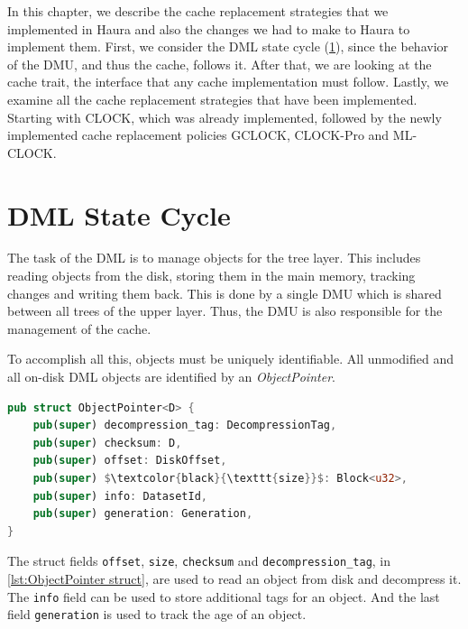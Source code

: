 \documentclass[
	12pt,
	a4paper,
	abstract,
	bibliography=totoc,
	chapterprefix,
	headings=openright,
	numbers=endperiod,
	parskip=half,
	twoside,
]{scrreprt}
\begin{document}

In this chapter, we describe the cache replacement strategies that we implemented in Haura 
and also the changes we had to make to Haura to implement them.
First, we consider the DML state cycle (\cref{sec:dml state cycle}), 
since the behavior of the DMU, and thus the cache, follows it.
After that, we are looking at the cache trait, the interface that any cache implementation must follow.
Lastly, we examine all the cache replacement strategies that have been implemented.
Starting with CLOCK, which was already implemented,
followed by the newly implemented cache replacement policies GCLOCK, CLOCK-Pro and ML-CLOCK.


\section{DML State Cycle}
\label{sec:dml state cycle}

The task of the DML is to manage objects for the tree layer. This includes reading objects from the disk, storing them in the main memory, tracking changes and writing them back.
This is done by a single DMU which is shared between all trees of the upper layer.
Thus, the DMU is also responsible for the management of the cache.

To accomplish all this, objects must be uniquely identifiable.
All unmodified and all on-disk DML objects are identified by an \emph{ObjectPointer}.

\bigskip

\begin{lstlisting}[language=Rust,mathescape=true,caption=ObjectPointer struct ,label=lst:ObjectPointer struct]
pub struct ObjectPointer<D> {
    pub(super) decompression_tag: DecompressionTag,
    pub(super) checksum: D,
    pub(super) offset: DiskOffset,
    pub(super) $\textcolor{black}{\texttt{size}}$: Block<u32>,
    pub(super) info: DatasetId,
    pub(super) generation: Generation,
}
\end{lstlisting}

The struct fields \texttt{offset}, \texttt{size}, \texttt{checksum} and \texttt{decompression\_tag}, in \cref{lst:ObjectPointer struct}, are used to read an object from disk and decompress it.
The \texttt{info} field can be used to store additional tags for an object.
And the last field \texttt{generation} is used to track the age of an object.
\end{document}

